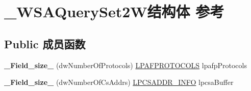 \hypertarget{struct___w_s_a_query_set2_w}{}\section{\+\_\+\+W\+S\+A\+Query\+Set2\+W结构体 参考}
\label{struct___w_s_a_query_set2_w}
\subsection*{Public 成员函数}
\begin{DoxyCompactItemize}
\item 
\mbox{\label{struct___w_s_a_query_set2_w_ac59ee015a170c6af851742063efc78a0}} 
{\bfseries \+\_\+\+Field\+\_\+size\+\_\+} (dw\+Number\+Of\+Protocols) \hyperlink{struct___a_f_p_r_o_t_o_c_o_l_s}{L\+P\+A\+F\+P\+R\+O\+T\+O\+C\+O\+LS} lpafp\+Protocols
\item 
\mbox{\label{struct___w_s_a_query_set2_w_aa70ce9171220176d84b1c7f85dc45194}} 
{\bfseries \+\_\+\+Field\+\_\+size\+\_\+} (dw\+Number\+Of\+Cs\+Addrs) \hyperlink{struct___c_s_a_d_d_r___i_n_f_o}{L\+P\+C\+S\+A\+D\+D\+R\+\_\+\+I\+N\+FO} lpcsa\+Buffer
\end{DoxyCompactItemize}

